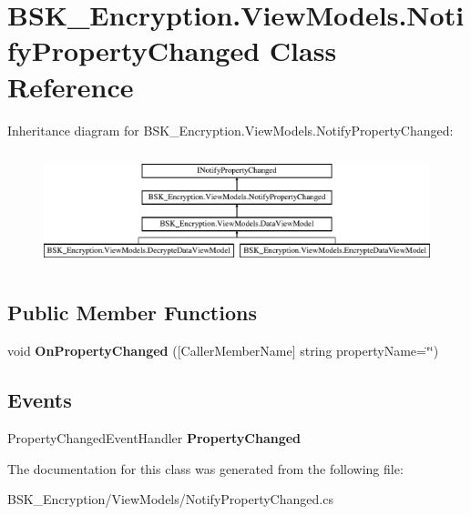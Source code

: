 \hypertarget{class_b_s_k___encryption_1_1_view_models_1_1_notify_property_changed}{}\section{B\+S\+K\+\_\+\+Encryption.\+View\+Models.\+Notify\+Property\+Changed Class Reference}
\label{class_b_s_k___encryption_1_1_view_models_1_1_notify_property_changed}
Inheritance diagram for B\+S\+K\+\_\+\+Encryption.\+View\+Models.\+Notify\+Property\+Changed\+:\begin{figure}[H]
\begin{center}
\leavevmode
\includegraphics[height=3.393939cm]{class_b_s_k___encryption_1_1_view_models_1_1_notify_property_changed}
\end{center}
\end{figure}
\subsection*{Public Member Functions}
\begin{DoxyCompactItemize}
\item 
\mbox{\label{class_b_s_k___encryption_1_1_view_models_1_1_notify_property_changed_afe474cbf0d45c9fefa3ead91095bac89}} 
void {\bfseries On\+Property\+Changed} (\mbox{[}Caller\+Member\+Name\mbox{]} string property\+Name=\char`\"{}\char`\"{})
\end{DoxyCompactItemize}
\subsection*{Events}
\begin{DoxyCompactItemize}
\item 
\mbox{\label{class_b_s_k___encryption_1_1_view_models_1_1_notify_property_changed_a719ad354061f0bf6f3aaa4a5093fdb2f}} 
Property\+Changed\+Event\+Handler {\bfseries Property\+Changed}
\end{DoxyCompactItemize}


The documentation for this class was generated from the following file\+:\begin{DoxyCompactItemize}
\item 
B\+S\+K\+\_\+\+Encryption/\+View\+Models/Notify\+Property\+Changed.\+cs\end{DoxyCompactItemize}
